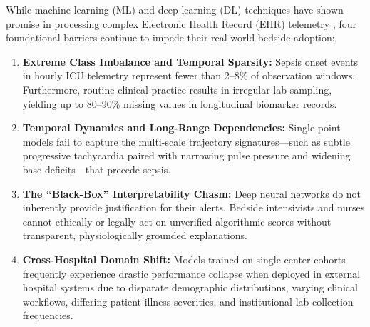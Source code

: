 \documentclass[conference]{IEEEtran}
\begin{document}
While machine learning (ML) and deep learning (DL) techniques have shown promise in processing complex Electronic Health Record (EHR) telemetry \cite{komorowski2018, shamout2020}, four foundational barriers continue to impede their real-world bedside adoption:
\begin{enumerate}
    \item \textbf{Extreme Class Imbalance and Temporal Sparsity:} Sepsis onset events in hourly ICU telemetry represent fewer than 2--8\% of observation windows. Furthermore, routine clinical practice results in irregular lab sampling, yielding up to 80--90\% missing values in longitudinal biomarker records.
    \item \textbf{Temporal Dynamics and Long-Range Dependencies:} Single-point models fail to capture the multi-scale trajectory signatures---such as subtle progressive tachycardia paired with narrowing pulse pressure and widening base deficits---that precede sepsis.
    \item \textbf{The ``Black-Box'' Interpretability Chasm:} Deep neural networks do not inherently provide justification for their alerts. Bedside intensivists and nurses cannot ethically or legally act on unverified algorithmic scores without transparent, physiologically grounded explanations.
    \item \textbf{Cross-Hospital Domain Shift:} Models trained on single-center cohorts frequently experience drastic performance collapse when deployed in external hospital systems due to disparate demographic distributions, varying clinical workflows, differing patient illness severities, and institutional lab collection frequencies.
\end{enumerate}
\end{document}
